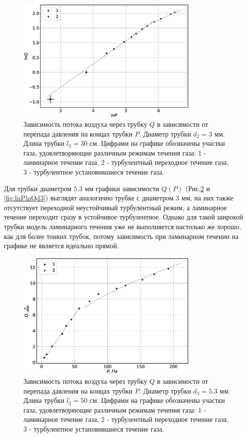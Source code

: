 \documentclass[12pt]{article}
\begin{document}
\begin{figure}[H]
    \centering
    \includegraphics[width=0.8\textwidth]{lnPlnQd2.eps}
    \caption{Зависимость потока воздуха через трубку $Q$ в зависимости от перепада давления на концах
        трубки $P$. Диаметр трубки $d_2 = 3$ мм. Длина трубки $l_2 = 30$ см. Цифрами на графике обозначены 
        участки газа, удовлетворяющие различным режимам течения газа: 
        1 - ламинарное течение газа,
        2 - турбулентный переходное течение газа, 
        3 - турбулентное установившиеся течение газа.}
    \label{fig:lnPlnQd2}
\end{figure}
Для трубки диаметром $5.3$ мм графики зависимости $Q(P)$ (Рис.\ref{fig:PQd3} и \ref{fig:lnPlnQd3}) выглядят аналогично трубке с диаметром $3$ мм, 
на них также отсутствует переходной неустойчивый турбулентный режим, а ламинарное течение переходит сразу в 
устойчивое турбулентное. Однако для такой широкой трубки модель ламинарного течения уже не выполняется 
настолько же хорошо, как для более тонких трубок, потому зависимость при ламинарном течении на графике 
не является идеально прямой.
\begin{figure}[H]
    \centering
    \includegraphics[width=0.8\textwidth]{PQd3.eps}
    \caption{Зависимость потока воздуха через трубку $Q$ в зависимости от перепада давления на концах
        трубки $P$. Диаметр трубки $d_3 = 5.3$ мм. Длина трубки $l_3 = 50$ см. Цифрами на графике обозначены 
        участки газа, удовлетворяющие различным режимам течения газа: 
        1 - ламинарное течение газа,
        2 - турбулентный переходное течение газа, 
        3 - турбулентное установившиеся течение газа.}
    \label{fig:PQd3}
\end{figure}
\end{document}
